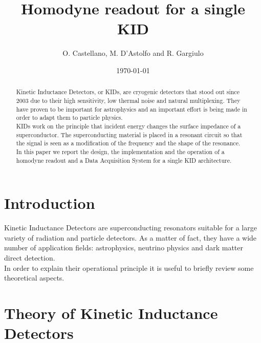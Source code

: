 \documentclass[12pt]{article}
\begin{document}
\title{Homodyne readout for a single KID}
\author{O. Castellano, M. D'Astolfo and R. Gargiulo}
\date{\today}
\maketitle

\begin{abstract}
Kinetic Inductance Detectors, or KIDs, are cryogenic detectors that stood out since 2003 due to their high sensitivity, low thermal noise and natural multiplexing. They have proven to be important for astrophysics and an important effort is being made in order to adapt them to particle physics.\\
KIDs work on the principle that incident energy changes the surface impedance of a superconductor. 
The superconducting material is placed in a resonant circuit so that the signal is seen as a modification of the frequency and the shape of the resonance.\\
In this paper we report the design, the implementation and the operation of a homodyne readout and a Data Acquisition System for a single KID architecture.
\end{abstract}

\tableofcontents

\newpage

\section{Introduction}
Kinetic Inductance Detectors are superconducting resonators suitable for a large variety of radiation and particle detectors. As a matter of fact, they have a wide number of application fields: astrophysics, neutrino physics and dark matter direct detection.\\
In order to explain their operational principle it is useful to briefly review some theoretical aspects.

\section{Theory of Kinetic Inductance Detectors}
\end{document}
